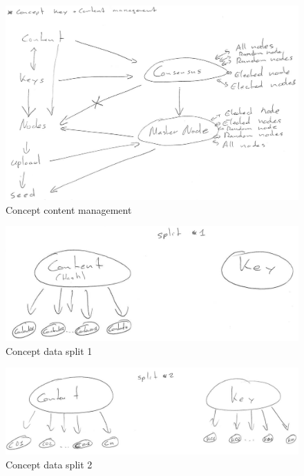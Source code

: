 \begin{figure}[htpb]
\centering
\begin{adjustbox}{center}
\includegraphics[scale=0.7]{annexes/concepts/oc-concept-key-content-management.png}
\end{adjustbox}
\caption{Concept content management
\label{fig:oc-concept-key-content-management}} 
\end{figure}

\begin{figure}[htpb]
\centering
\begin{adjustbox}{center}
\includegraphics[scale=0.8]{annexes/concepts/oc-concept-split1.png}
\end{adjustbox}
\caption{Concept data split 1
\label{fig:oc-concept-split1}} 
\end{figure}

\begin{figure}[htpb]
\centering
\begin{adjustbox}{center}
\includegraphics[scale=0.7]{annexes/concepts/oc-concept-split2.png}
\end{adjustbox}
\caption{Concept data split 2
\label{fig:oc-concept-split2}} 
\end{figure}


